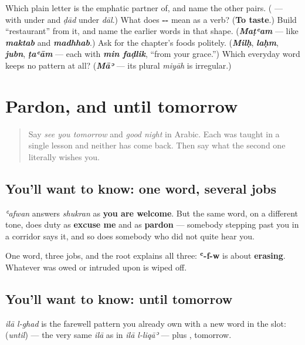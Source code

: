 \begin{tcolorbox}[breakable,colback=teal!4,colframe=teal!35!black,title={Before you move on}]
Which plain letter is \textbf{} the emphatic partner of, and name the other pairs. (\textbf{} — with \textbf{} under \textbf{} and \emph{ḍād} under \emph{dāl}.) What does \textbf{--} mean as a verb? (\textbf{To taste}.) Build \textquotedblleft{}restaurant\textquotedblright{} from it, and name the earlier words in that shape. (\emph{\textbf{Maṭʿam}} — like \emph{\textbf{maktab}} and \emph{\textbf{madhhab}}.) Ask for the chapter's foods politely. (\emph{\textbf{Milḥ}}, \emph{\textbf{laḥm}}, \emph{\textbf{jubn}}, \emph{\textbf{ṭaʿām}} — each with \emph{\textbf{min faḍlik}}, \textquotedblleft{}from your grace.\textquotedblright{}) Which everyday word keeps no pattern at all? (\emph{\textbf{Māʾ}} — its plural \emph{miyāh} is irregular.)
\end{tcolorbox}
\section[\texorpdfstring{\ar{عفوا} · \ar{إلى} \ar{الغد} … (ʿafwan · ilā …)}{عفوا · إلى الغد … (ʿafwan · ilā …)}]{Pardon, and until tomorrow}

\label{lesson:AR-R34-pardon-and-until-tomorrow}



\begin{quote}
Say \emph{see you tomorrow} and \emph{good night} in Arabic. Each was taught in a single lesson and neither has come back. Then say what the second one literally wishes you.
\end{quote}

\subsection*{You'll want to know: one word, several jobs}
\textbf{} \emph{ʿafwan} answers \emph{shukran} as \textbf{you are welcome}. But the same word, on a different tone, does duty as \textbf{excuse me} and as \textbf{pardon} — somebody stepping past you in a corridor says it, and so does somebody who did not quite hear you.

One word, three jobs, and the root explains all three: \textbf{ʿ-f-w} is about \textbf{erasing}. Whatever was owed or intruded upon is wiped off.

\subsection*{You'll want to know: until tomorrow}
\textbf{ } \emph{ilā l-ghad} is the farewell pattern you already own with a new word in the slot: \textbf{} (\emph{until}) — the very same \emph{ilā} as in \emph{ilā l-liqāʾ} — plus \textbf{}, tomorrow.

